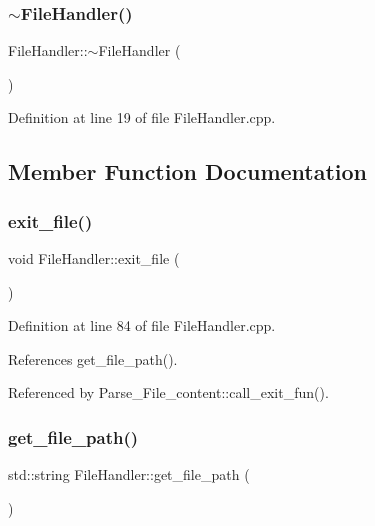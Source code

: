 \subsubsection{\texorpdfstring{$\sim$\+File\+Handler()}{~FileHandler()}}
{\footnotesize\ttfamily File\+Handler\+::$\sim$\+File\+Handler (\begin{DoxyParamCaption}{ }\end{DoxyParamCaption})\hspace{0.3cm}{\ttfamily [virtual]}}



Definition at line 19 of file File\+Handler.\+cpp.



\subsection{Member Function Documentation}
\mbox{\label{class_file_handler_ab8bd470616da49ac3fc662f161db4b9b}} 
\subsubsection{\texorpdfstring{exit\+\_\+file()}{exit\_file()}}
{\footnotesize\ttfamily void File\+Handler\+::exit\+\_\+file (\begin{DoxyParamCaption}{ }\end{DoxyParamCaption})}



Definition at line 84 of file File\+Handler.\+cpp.



References get\+\_\+file\+\_\+path().



Referenced by Parse\+\_\+\+File\+\_\+content\+::call\+\_\+exit\+\_\+fun().

\mbox{\label{class_file_handler_ad3960a2c229347073f6ffc53e0ebceec}} 
\subsubsection{\texorpdfstring{get\+\_\+file\+\_\+path()}{get\_file\_path()}}
{\footnotesize\ttfamily std\+::string File\+Handler\+::get\+\_\+file\+\_\+path (\begin{DoxyParamCaption}{ }\end{DoxyParamCaption})}



